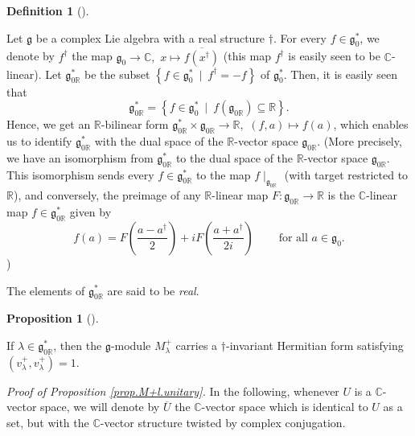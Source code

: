 \documentclass
[numbers=enddot,12pt,final,onecolumn,german,notitlepage]{scrartcl}%
\theoremstyle{definition}
\newtheorem{prop}[theo]{Proposition}
\newenvironment{proposition}[1][]
{\begin{prop}[#1]\begin{leftbar}}
{\end{leftbar}\end{prop}}
\newtheorem{defi}[theo]{Definition}
\newenvironment{definition}[1][]
{\begin{defi}[#1]\begin{leftbar}}
{\end{leftbar}\end{defi}}
\begin{document}
\begin{definition}
Let $\mathfrak{g}$ be a complex Lie algebra with a real structure $\dag$. For
every $f\in\mathfrak{g}_{0}^{\ast}$, we denote by $f^{\dag}$ the map
$\mathfrak{g}_{0}\rightarrow\mathbb{C},$ $x\mapsto\overline{f\left(  x^{\dag
}\right)  }$ (this map $f^{\dag}$ is easily seen to be $\mathbb{C}$-linear).
Let $\mathfrak{g}_{0\mathbb{R}}^{\ast}$ be the subset $\left\{  f\in
\mathfrak{g}_{0}^{\ast}\ \mid\ f^{\dag}=-f\right\}  $ of $\mathfrak{g}%
_{0}^{\ast}$. Then, it is easily seen that%
\[
\mathfrak{g}_{0\mathbb{R}}^{\ast}=\left\{  f\in\mathfrak{g}_{0}^{\ast}%
\ \mid\ f\left(  \mathfrak{g}_{0\mathbb{R}}\right)  \subseteq\mathbb{R}%
\right\}  .
\]
Hence, we get an $\mathbb{R}$-bilinear form $\mathfrak{g}_{0\mathbb{R}}^{\ast
}\times\mathfrak{g}_{0\mathbb{R}}\rightarrow\mathbb{R},$ $\left(  f,a\right)
\mapsto f\left(  a\right)  $, which enables us to identify $\mathfrak{g}%
_{0\mathbb{R}}^{\ast}$ with the dual space of the $\mathbb{R}$-vector space
$\mathfrak{g}_{0\mathbb{R}}$. (More precisely, we have an isomorphism from
$\mathfrak{g}_{0\mathbb{R}}^{\ast}$ to the dual space of the $\mathbb{R}%
$-vector space $\mathfrak{g}_{0\mathbb{R}}$. This isomorphism sends every
$f\in\mathfrak{g}_{0\mathbb{R}}^{\ast}$ to the map $f\mid_{\mathfrak{g}%
_{0\mathbb{R}}}$ (with target restricted to $\mathbb{R}$), and conversely, the
preimage of any $\mathbb{R}$-linear map $F:\mathfrak{g}_{0\mathbb{R}%
}\rightarrow\mathbb{R}$ is the $\mathbb{C}$-linear map $f\in\mathfrak{g}%
_{0\mathbb{R}}^{\ast}$ given by%
\[
f\left(  a\right)  =F\left(  \dfrac{a-a^{\dag}}{2}\right)  +iF\left(
\dfrac{a+a^{\dag}}{2i}\right)  \ \ \ \ \ \ \ \ \ \ \text{for all }%
a\in\mathfrak{g}_{0}.
\]
)

The elements of $\mathfrak{g}_{0\mathbb{R}}^{\ast}$ are said to be
\textit{real}.
\end{definition}

\begin{proposition}
\label{prop.M+l.unitary}If $\lambda\in\mathfrak{g}_{0\mathbb{R}}^{\ast}$, then
the $\mathfrak{g}$-module $M_{\lambda}^{+}$ carries a $\dag$-invariant
Hermitian form satisfying $\left(  v_{\lambda}^{+},v_{\lambda}^{+}\right)  =1$.
\end{proposition}

\textit{Proof of Proposition \ref{prop.M+l.unitary}.} In the following,
whenever $U$ is a $\mathbb{C}$-vector space, we will denote by $\overline{U}$
the $\mathbb{C}$-vector space which is identical to $U$ as a set, but with the
$\mathbb{C}$-vector structure twisted by complex conjugation.
\end{document}
